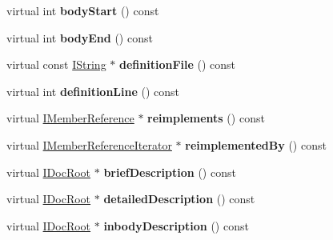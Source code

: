 \begin{DoxyCompactItemize}
\item 
\hypertarget{class_member_handler_a8e2f62b2a69f00c43615a0faf28fbf81}{virtual int {\bfseries body\-Start} () const }\label{class_member_handler_a8e2f62b2a69f00c43615a0faf28fbf81}

\item 
\hypertarget{class_member_handler_a4f09d7d2cdf7a04b08b3fcee1dc09e77}{virtual int {\bfseries body\-End} () const }\label{class_member_handler_a4f09d7d2cdf7a04b08b3fcee1dc09e77}

\item 
\hypertarget{class_member_handler_af23fb08ef9808259ff1839cea642a30f}{virtual const \hyperlink{class_i_string}{I\-String} $\ast$ {\bfseries definition\-File} () const }\label{class_member_handler_af23fb08ef9808259ff1839cea642a30f}

\item 
\hypertarget{class_member_handler_a69cbbe0e4a5afa541e87c08ac6dafb35}{virtual int {\bfseries definition\-Line} () const }\label{class_member_handler_a69cbbe0e4a5afa541e87c08ac6dafb35}

\item 
\hypertarget{class_member_handler_ae81dda2c58e420f321ec8160b2a96b13}{virtual \hyperlink{class_i_member_reference}{I\-Member\-Reference} $\ast$ {\bfseries reimplements} () const }\label{class_member_handler_ae81dda2c58e420f321ec8160b2a96b13}

\item 
\hypertarget{class_member_handler_a682af23590792ff2bd6108f4f8f44d6d}{virtual \hyperlink{class_i_member_reference_iterator}{I\-Member\-Reference\-Iterator} $\ast$ {\bfseries reimplemented\-By} () const }\label{class_member_handler_a682af23590792ff2bd6108f4f8f44d6d}

\item 
\hypertarget{class_member_handler_a90d0ec3bda5465dfb8c7b986c9bc2f1f}{virtual \hyperlink{class_i_doc_root}{I\-Doc\-Root} $\ast$ {\bfseries brief\-Description} () const }\label{class_member_handler_a90d0ec3bda5465dfb8c7b986c9bc2f1f}

\item 
\hypertarget{class_member_handler_a125deb50c49081b484e9a688e73382fe}{virtual \hyperlink{class_i_doc_root}{I\-Doc\-Root} $\ast$ {\bfseries detailed\-Description} () const }\label{class_member_handler_a125deb50c49081b484e9a688e73382fe}

\item 
\hypertarget{class_member_handler_afb71a91a7df82ed8ac91d4ced0ebff72}{virtual \hyperlink{class_i_doc_root}{I\-Doc\-Root} $\ast$ {\bfseries inbody\-Description} () const }\label{class_member_handler_afb71a91a7df82ed8ac91d4ced0ebff72}


\end{DoxyCompactItemize}
